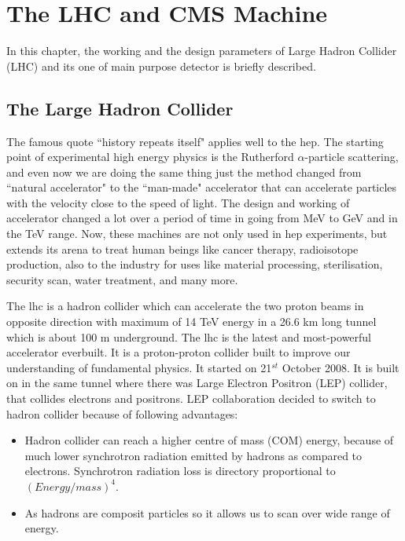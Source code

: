 \chapter{The LHC and CMS Machine}
In this chapter, the working and the design parameters of Large Hadron Collider (LHC) and its one of main purpose detector is briefly described.

\section{The Large Hadron Collider}
The famous quote ``history repeats itself" applies well to the \acrfull{hep}. The starting point of experimental high energy physics is the Rutherford $\alpha$-particle scattering, and even now we are doing the same thing just the method changed from ``natural accelerator" to the ``man-made" accelerator that can accelerate particles with the velocity close to the speed of light. The design and working of accelerator changed a lot over a period of time in going from MeV to GeV and in the TeV range. Now, these machines are not only used in \acrshort{hep} experiments, but extends its arena to treat human beings like cancer therapy, radioisotope production, also to the industry for uses like material processing, sterilisation, security scan, water treatment, and many more. 

The \acrfull{lhc} is  a hadron collider which can accelerate the two proton beams in opposite direction with maximum of 14 TeV energy in a 26.6 km long tunnel which is about 100 m underground. 
The \acrfull{lhc} is the latest and most-powerful accelerator everbuilt. It is a proton-proton collider built to improve our understanding of fundamental physics. It started on 21$^{st}$ October 2008. It is built on in the same tunnel where there was Large Electron Positron (LEP) collider, that collides electrons and positrons. LEP collaboration decided to switch to hadron collider because of following advantages:
\begin{itemize}
    \item Hadron collider can reach a higher centre of mass (COM) energy, because of much lower synchrotron radiation emitted by hadrons as compared to electrons. Synchrotron radiation loss is directory proportional to $(Energy/mass)^4$.
    \item As hadrons are composit particles so it allows us to scan over wide range of energy.
\end{itemize}

